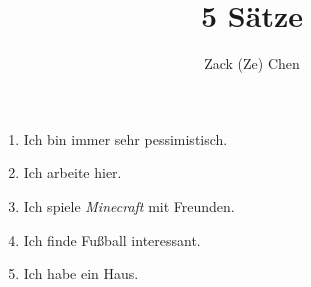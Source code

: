 \documentclass{article}
\title{5 S\"atze}
\author{Zack (Ze) Chen}
\begin{document}
\maketitle

\begin{enumerate}
    \item Ich bin immer sehr pessimistisch.
    \item Ich arbeite hier.
    \item Ich spiele \textit{Minecraft} mit Freunden.
    \item Ich finde Fu\ss{}ball interessant.
    \item Ich habe ein Haus.
\end{enumerate}

% 
% 
\end{document}
